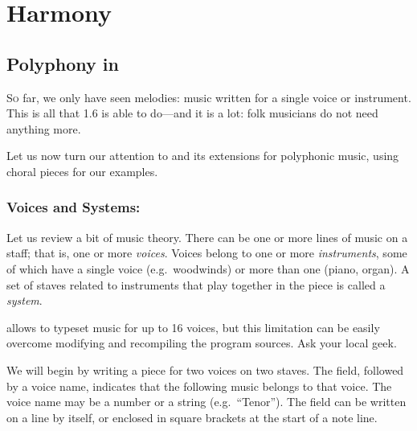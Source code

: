 \documentclass[a4paper,12pt]{book}
\begin{document}


\noteseparator



\chapter{Harmony}

\section{Polyphony in \ABC}
\label{sec:polyphony}

\lettrine{S}{o} far, we only have seen melodies: music written for a
single voice or instrument. This is all that \ABC{} 1.6 is able to
do---and it is a lot: folk musicians do not need anything more.

Let us now turn our attention to \ABCPLUS{} and its extensions for
polyphonic music, using choral pieces for our examples.


\subsection{Voices and Systems: }

Let us review a bit of music theory. There can be one or more lines of
music on a staff; that is, one or more \emph{voices}. Voices belong to
one or more \emph{instruments}, some of which have a single voice
(e.g.\ woodwinds) or more than one (piano, organ). A set of staves
related to instruments that play together in the piece is called a
\emph{system}.

\begin{note}

  \abcm{} allows to typeset music for up to 16 voices, but this
  limitation can be easily overcome modifying and recompiling the
  program sources. Ask your local geek.

\end{note}

We will begin by writing a piece for two voices on two staves. The
 field, followed by a voice name, indicates that the
following music belongs to that voice. The voice name may be a number
or a string (e.g.\ ``Tenor''). The  field can be written on
a line by itself, or enclosed in square brackets at the start of a
note line.
\end{document}
